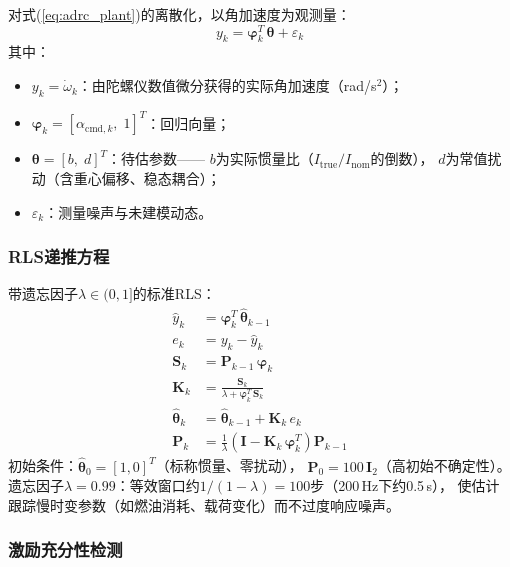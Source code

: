 对式(\ref{eq:adrc_plant})的离散化，以角加速度为观测量：
\begin{equation}
    y_k = \boldsymbol{\varphi}_k^T\,\boldsymbol{\theta} + \varepsilon_k
    \label{eq:rls_model}
\end{equation}
其中：
\begin{itemize}
    \item $y_k = \dot\omega_k$：由陀螺仪数值微分获得的实际角加速度（rad/s$^2$）；
    \item $\boldsymbol{\varphi}_k = [\alpha_{\mathrm{cmd},k},\;1]^T$：回归向量；
    \item $\boldsymbol{\theta} = [b,\;d]^T$：待估参数——
          $b$为实际惯量比（$I_{\mathrm{true}}/I_{\mathrm{nom}}$的倒数），
          $d$为常值扰动（含重心偏移、稳态耦合）；
    \item $\varepsilon_k$：测量噪声与未建模动态。
\end{itemize}

\subsubsection{RLS递推方程}

带遗忘因子$\lambda\in(0,1]$的标准RLS：
\begin{equation}
    \boxed{
    \begin{aligned}
        \hat{y}_k &= \boldsymbol{\varphi}_k^T\,\hat{\boldsymbol{\theta}}_{k-1} \\
        e_k &= y_k - \hat{y}_k \\
        \mathbf{S}_k &= \mathbf{P}_{k-1}\,\boldsymbol{\varphi}_k \\
        \mathbf{K}_k &= \frac{\mathbf{S}_k}{\lambda + \boldsymbol{\varphi}_k^T\,\mathbf{S}_k} \\
        \hat{\boldsymbol{\theta}}_k &= \hat{\boldsymbol{\theta}}_{k-1}
            + \mathbf{K}_k\,e_k \\
        \mathbf{P}_k &= \frac{1}{\lambda}
            \left(\mathbf{I} - \mathbf{K}_k\,\boldsymbol{\varphi}_k^T\right)
            \mathbf{P}_{k-1}
    \end{aligned}
    }
    \label{eq:rls_update}
\end{equation}
初始条件：$\hat{\boldsymbol{\theta}}_0=[1,0]^T$（标称惯量、零扰动），
$\mathbf{P}_0=100\,\mathbf{I}_2$（高初始不确定性）。
遗忘因子$\lambda=0.99$：等效窗口约$1/(1-\lambda)=100$步（200\,Hz下约0.5\,s），
使估计跟踪慢时变参数（如燃油消耗、载荷变化）而不过度响应噪声。

\subsubsection{激励充分性检测}

